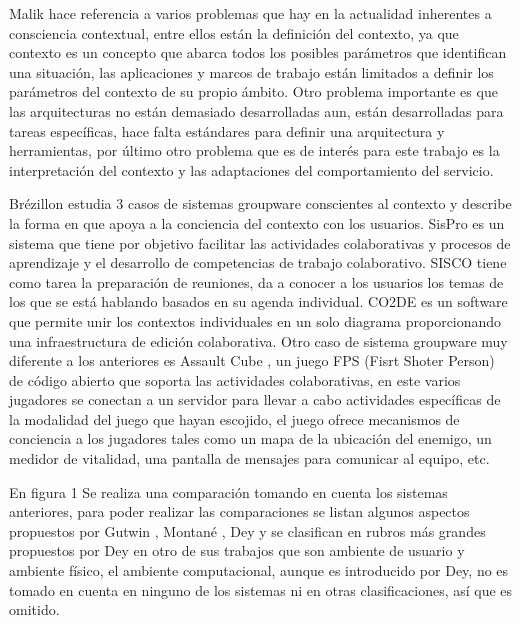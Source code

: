 Malik \cite{malik2007future} hace referencia a varios problemas que hay en la actualidad inherentes a consciencia contextual, entre ellos est\'an la definici\'on del contexto, ya que contexto es un concepto que abarca todos los posibles par\'ametros que identifican una situaci\'on, las aplicaciones y marcos de trabajo est\'an limitados a definir los par\'ametros del contexto de su propio \'ambito. Otro problema importante es que las arquitecturas no est\'an demasiado desarrolladas aun, est\'an desarrolladas para tareas espec\'ificas, hace falta est\'andares para definir una arquitectura y herramientas, por \'ultimo otro problema que es de inter\'es para este trabajo es la interpretaci\'on del contexto y las adaptaciones del comportamiento del servicio. 

Br\'ezillon \cite{brezillon2004context} estudia 3 casos de sistemas groupware conscientes al contexto y describe la forma en que apoya a la conciencia del contexto con los usuarios. SisPro es un sistema que tiene por objetivo facilitar las actividades colaborativas y procesos de aprendizaje y el desarrollo de competencias de trabajo colaborativo. SISCO tiene como tarea la preparaci\'on de reuniones,  da a conocer a los usuarios los temas de los que se est\'a hablando basados en su agenda individual. CO2DE es un software que permite unir los contextos individuales en un solo diagrama proporcionando una infraestructura de edici\'on colaborativa. Otro caso de sistema groupware muy diferente a los anteriores es Assault Cube \cite{montane2013context}, un juego FPS (Fisrt Shoter Person) de c\'odigo abierto que soporta las actividades colaborativas, en este varios jugadores se conectan a un servidor para llevar a cabo actividades espec\'ificas de la modalidad del juego que hayan escojido, el juego ofrece mecanismos de conciencia a los jugadores tales como un mapa de la ubicaci\'on del enemigo, un medidor de vitalidad, una pantalla de mensajes para comunicar al equipo, etc.

En figura 1 Se realiza una comparaci\'on tomando en cuenta los sistemas anteriores, para poder realizar las comparaciones se listan algunos aspectos propuestos por Gutwin \cite{gutwin1996supporting}, Montan\'e \cite{montane2013context}, Dey \cite{dey2001conceptual} y se clasifican en rubros m\'as grandes propuestos por Dey en otro de sus trabajos que son ambiente de usuario y ambiente f\'isico, el ambiente computacional, aunque es introducido por Dey, no es tomado en cuenta en ninguno de los sistemas ni en otras clasificaciones, as\'i que es omitido.

